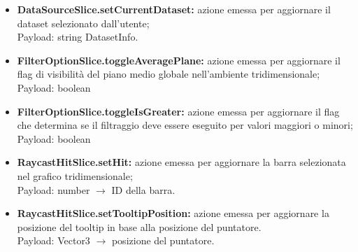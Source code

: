 \begin{itemize}
        \item \textbf{DataSourceSlice.setCurrentDataset:} azione emessa per aggiornare il dataset selezionato dall'utente; \\ Payload: string DatasetInfo.
        \item \textbf{FilterOptionSlice.toggleAveragePlane:} azione emessa per aggiornare il flag di visibilità del piano medio globale nell'ambiente tridimensionale; \\ Payload: boolean 
        \item \textbf{FilterOptionSlice.toggleIsGreater:} azione emessa per aggiornare il flag che determina se il filtraggio deve essere eseguito per valori maggiori o minori; \\ Payload: boolean
        \item \textbf{RaycastHitSlice.setHit:} azione emessa per aggiornare la barra selezionata nel grafico tridimensionale; \\ Payload: number $\rightarrow$ ID della barra.
        \item \textbf{RaycastHitSlice.setTooltipPosition:} azione emessa per aggiornare la posizione del tooltip in base alla posizione del puntatore.\\ Payload: Vector3 $\rightarrow$ posizione del puntatore.
    \end{itemize}
